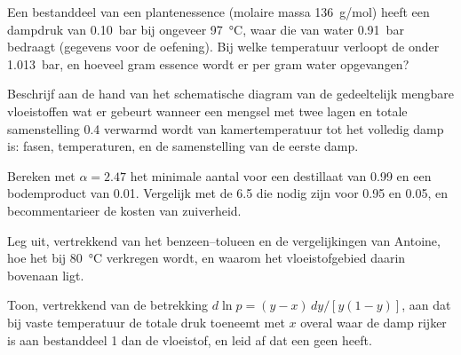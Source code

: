 \begin{exercise}[$\star\star$]\label{exo:b2:liquid-vapour-diagrams:8}
Een bestanddeel van een plantenessence (molaire massa \qty{136}{g/mol}) heeft een dampdruk
van \qty{0.10}{bar} bij ongeveer \qty{97}{\degreeCelsius}, waar die van water
\qty{0.91}{bar} bedraagt (gegevens voor de oefening). Bij welke temperatuur verloopt de
 onder \qty{1.013}{bar}, en hoeveel gram essence wordt er
per gram water opgevangen?
\end{exercise}

\begin{exercise}[$\star\star$]\label{exo:b2:liquid-vapour-diagrams:9}
Beschrijf aan de hand van het schematische diagram van de gedeeltelijk mengbare vloeistoffen wat er gebeurt
wanneer een mengsel met twee lagen en totale samenstelling 0.4 verwarmd wordt van
kamertemperatuur tot het volledig damp is: fasen, temperaturen, en de samenstelling
van de eerste damp.
\end{exercise}

\begin{exercise}[$\star\star\star$]\label{exo:b2:liquid-vapour-diagrams:10}
Bereken met $\alpha = 2.47$ het minimale aantal  voor een
destillaat van 0.99 en een bodemproduct van 0.01. Vergelijk met de 6.5 die nodig zijn voor 0.95
en 0.05, en becommentarieer de kosten van zuiverheid.
\end{exercise}

\begin{exercise}[$\star\star\star$]\label{exo:b2:liquid-vapour-diagrams:11}
Leg uit, vertrekkend van het  benzeen--tolueen en de vergelijkingen van Antoine,
hoe het  bij \qty{80}{\degreeCelsius} verkregen wordt,
en waarom het vloeistofgebied daarin bovenaan ligt.
\end{exercise}

\begin{exercise}[$\star\star\star$]\label{exo:b2:liquid-vapour-diagrams:12}
Toon, vertrekkend van de betrekking $d\ln p = (y - x)\,dy/[y(1 - y)]$, aan dat bij vaste
temperatuur de totale druk toeneemt met $x$ overal waar de damp
rijker is aan bestanddeel 1 dan de vloeistof, en leid af dat een  geen
 heeft.
\end{exercise}

